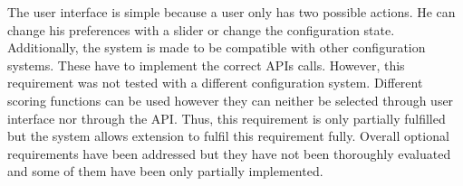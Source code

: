 The user interface is simple because a user only has two possible actions. He can change his preferences with a slider or change the configuration state. Additionally, the system is made to be compatible with other configuration systems. These have to implement the correct APIs calls. However, this requirement was not tested with a different configuration system. Different scoring functions can be used however they can neither be selected through user interface nor through the API. Thus, this requirement is only partially fulfilled but the system allows extension to fulfil this requirement fully.
Overall optional requirements have been addressed but they have not been thoroughly evaluated and some of them have been only partially implemented.